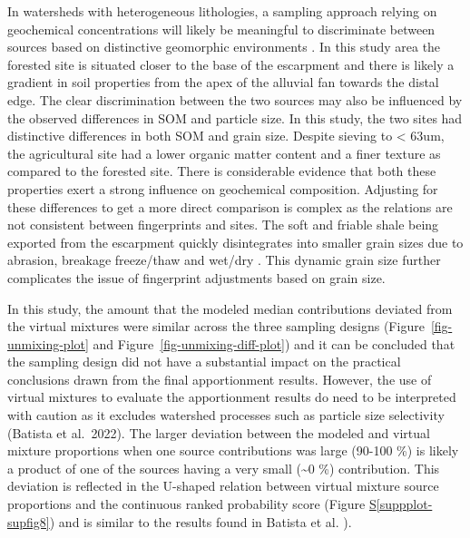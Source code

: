 \documentclass[
  number]{elsarticle}
\newcommand*\quartosuppplotref[1]{Figure \hyperref[#1]{S\ref{#1}}}
\begin{document}
In watersheds with heterogeneous lithologies, a sampling approach
relying on geochemical concentrations will likely be meaningful to
discriminate between sources based on distinctive geomorphic
environments \citep{evrard2022}. In this study area the forested site is
situated closer to the base of the escarpment and there is likely a
gradient in soil properties from the apex of the alluvial fan towards
the distal edge. The clear discrimination between the two sources may
also be influenced by the observed differences in SOM and particle size.
In this study, the two sites had distinctive differences in both SOM and
grain size. Despite sieving to \textless{} 63um, the agricultural site
had a lower organic matter content and a finer texture as compared to
the forested site. There is considerable evidence that both these
properties exert a strong influence on geochemical composition.
Adjusting for these differences to get a more direct comparison is
complex as the relations are not consistent between fingerprints and
sites. The soft and friable shale being exported from the escarpment
quickly disintegrates into smaller grain sizes due to abrasion, breakage
freeze/thaw and wet/dry \citep{koiter2013a}. This dynamic grain size
further complicates the issue of fingerprint adjustments based on grain
size.

In this study, the amount that the modeled median contributions deviated
from the virtual mixtures were similar across the three sampling designs
(Figure~\ref{fig-unmixing-plot} and Figure~\ref{fig-unmixing-diff-plot})
and it can be concluded that the sampling design did not have a
substantial impact on the practical conclusions drawn from the final
apportionment results. However, the use of virtual mixtures to evaluate
the apportionment results do need to be interpreted with caution as it
excludes watershed processes such as particle size selectivity (Batista
et al.~2022). The larger deviation between the modeled and virtual
mixture proportions when one source contributions was large (90-100 \%)
is likely a product of one of the sources having a very small
(\textasciitilde0 \%) contribution. This deviation is reflected in the
U-shaped relation between virtual mixture source proportions and the
continuous ranked probability score
(\quartosuppplotref{suppplot-supfig8}) and is similar to the results
found in Batista et al. \citep{batista2022}).
\end{document}
